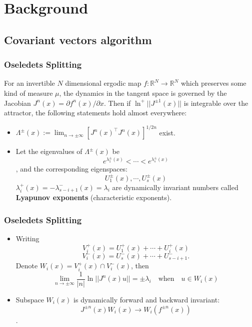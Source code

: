 \documentclass[mathserif, handout]{beamer}
\begin{document}
\section{Background}

\subsection{Covariant vectors algorithm}



\begin{frame}
  \frametitle{Oseledets Splitting \cite{ruelle79}}
  For an invertible $N$ dimensional ergodic map 
  $f:\mathbb{R}^N\to\mathbb{R}^N$ 
  which preserves some kind of measure $\mu$,
  the dynamics in the tangent space is governed by the Jacobian 
  $J^n(x)=\partial f^n(x)/\partial x$. Then if 
  $\ln^{+}||J^{\pm 1}(x)||$ is integrable over the attractor, the following
  statements hold almost everywhere:
  \begin{itemize}
  \item $\Lambda^{\pm}(x) :=\lim_{n\to\pm\infty}[J^n(x)^\top J^{n}(x)]^{1/2n}$ 
    exist.
    \pause
  \item Let the eigenvalues of $\Lambda^{\pm}(x)$ be 
    \[ e^{\lambda^{\pm}_1(x)}<\cdots<e^{\lambda^{\pm}_s(x)} \],
    and the corresponding eigenspaces:
    \[U^\pm_1(x), \cdots, U^\pm_s(x)\] 
    $\lambda^{+}_i(x)=-\lambda^{-}_{s-i+1}(x)=\lambda_i$ are 
    dynamically invariant numbers
    called \textbf{Lyapunov exponents} (characteristic exponents).\\
  
  \end{itemize}
 
\end{frame}


\begin{frame}
  \frametitle{Oseledets Splitting}
  \begin{itemize}
 
  \item
    Writing 
    \[V^+_i(x)=U^+_1(x)+\cdots+U^+_i(x)\]
    \[V^-_i(x)=U^-_s(x)+\cdots+U^-_{s-i+1} .\]
    Denote 
    $W_i(x)=V^+_i(x)\cap V^-_i(x)$, then
    \[
    \lim_{n\to\pm\infty}\frac{1}{|n|}\ln||J^n(x)u|| =
    \pm\lambda_i\quad\text{when}\quad
    u\in W_i(x)
    \]

    \pause 

  \item Subspace $W_i(x)$ is dynamically {\color{red} forward}
    and {\color{red} backward} invariant:
    \[J^{\pm n}(x)W_i(x) \to W_i(f^{\pm n}(x))\].
    
  \end{itemize}

  \pause



\end{frame}
\end{document}
